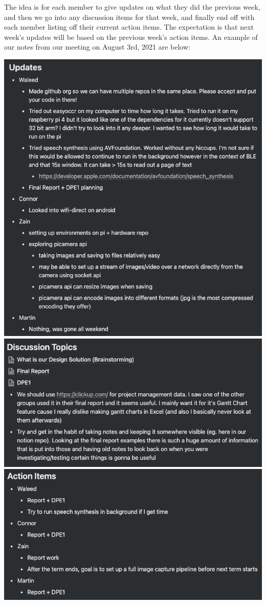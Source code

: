 \documentclass[a4paper,11pt]{article}
\begin{document}
\noindent
The idea is for each member to give updates on what they did the previous week, and then we go into any discussion items for that week, and finally end off with each member listing off their current action items. The expectation is that next week's updates will be based on the previous week's action items. An example of our notes from our meeting on August 3rd, 2021 are below:
\begin{center}
    \includegraphics[width={0.5\linewidth}]{img/notion/Aug3_Updates.png} \\
    \includegraphics[width={0.45\linewidth}]{img/notion/Aug3_Discussion.png}
    \includegraphics[width={0.45\linewidth}]{img/notion/Aug3_Action.png}

\end{center}
\end{document}
